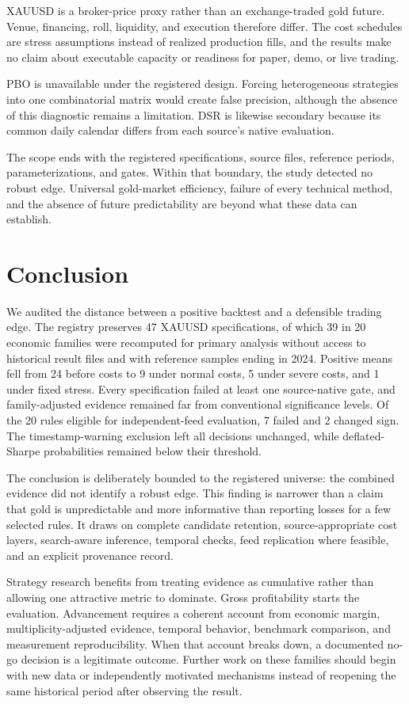 XAUUSD is a broker-price proxy rather than an exchange-traded gold future. Venue, financing, roll, liquidity, and execution therefore differ. The cost schedules are stress assumptions instead of realized production fills, and the results make no claim about executable capacity or readiness for paper, demo, or live trading.

PBO is unavailable under the registered design. Forcing heterogeneous strategies into one combinatorial matrix would create false precision, although the absence of this diagnostic remains a limitation. DSR is likewise secondary because its common daily calendar differs from each source's native evaluation.

The scope ends with the registered specifications, source files, reference periods, parameterizations, and gates. Within that boundary, the study detected no robust edge. Universal gold-market efficiency, failure of every technical method, and the absence of future predictability are beyond what these data can establish.

\section{Conclusion}\label{sec:conclusion}

We audited the distance between a positive backtest and a defensible trading edge. The registry preserves 47 XAUUSD specifications, of which 39 in 20 economic families were recomputed for primary analysis without access to historical result files and with reference samples ending in 2024. Positive means fell from 24 before costs to 9 under normal costs, 5 under severe costs, and 1 under fixed stress. Every specification failed at least one source-native gate, and family-adjusted evidence remained far from conventional significance levels. Of the 20 rules eligible for independent-feed evaluation, 7 failed and 2 changed sign. The timestamp-warning exclusion left all decisions unchanged, while deflated-Sharpe probabilities remained below their threshold.

The conclusion is deliberately bounded to the registered universe: the combined evidence did not identify a robust edge. This finding is narrower than a claim that gold is unpredictable and more informative than reporting losses for a few selected rules. It draws on complete candidate retention, source-appropriate cost layers, search-aware inference, temporal checks, feed replication where feasible, and an explicit provenance record.

Strategy research benefits from treating evidence as cumulative rather than allowing one attractive metric to dominate. Gross profitability starts the evaluation. Advancement requires a coherent account from economic margin, multiplicity-adjusted evidence, temporal behavior, benchmark comparison, and measurement reproducibility. When that account breaks down, a documented no-go decision is a legitimate outcome. Further work on these families should begin with new data or independently motivated mechanisms instead of reopening the same historical period after observing the result.
